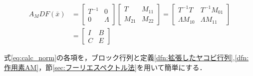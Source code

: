 \begin{equation}
  \begin{split}
    A_M DF(\bar{x}) &= \left[ \begin{array}{c|c}
      T^{-1} & 0 \\ \hline
      0 & \Lambda
    \end{array}\right]
    \left[ \begin{array}{c|c}
      T & M_{11} \\ \hline
      M_{21} & M_{22}
    \end{array} \right]
    = \left[ \begin{array}{c|c}
      T^{-1} T & T^{-1}M_{01} \\ \hline
      \Lambda M_{10} & \Lambda M_{11}
    \end{array} \right] \\
    &= \left[ \begin{array}{c|c}
      I & B \\ \hline
      C & E
    \end{array} \right]
  \end{split}
\end{equation}

式\eqref{eq:calc_norm}の各項を，ブロック行列と定義\ref{dfn:拡張したヤコビ行列},\ref{dfn:作用素AM}，節\ref{sec:フーリエスペクトル法}を用いて簡単にする．

